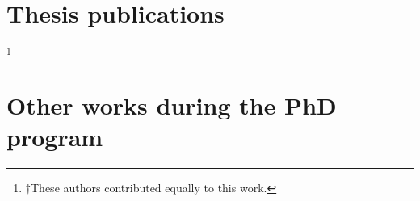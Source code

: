 \chapter*{Thesis publications}
\begin{refsection}[ownpubs]
  \small%
  \nocite{*}
  \newrefcontext[sorting=ynt]
  \printbibliography[heading=none]
\end{refsection}

\let\svthefootnote\thefootnote
\let\thefootnote\relax\footnote{$\dagger$These authors contributed equally to this work.}
\addtocounter{footnote}{-1}\let\thefootnote\svthefootnote

\begingroup
\let\clearpage\relax
{}
\chapter*{Other works during the PhD program}
\begin{refsection}[sidepubs]
  \small%
  \nocite{*}
  \newrefcontext[sorting=ynt]
  \printbibliography[heading=none]
\end{refsection}
\endgroup

%


